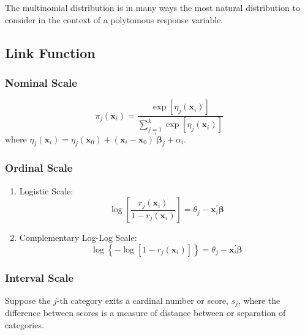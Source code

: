 The multinomial distribution is in many ways the most natural distribution to consider in the context of a polytomous response variable.

\subsection{Link Function}

\subsubsection*{Nominal Scale}

\begin{equation}
    \pi_{j}\left(\mathbf{x}_{i}\right)=\frac{\exp \left[\eta_{j}\left(\mathbf{x}_{i}\right)\right]}{\sum_{j=1}^{k} \exp \left[\eta_{j}\left(\mathbf{x}_{i}\right)\right]}
\end{equation}
where $\eta_{j}\left(\mathbf{x}_{i}\right)=\eta_{j}\left(\mathbf{x}_{0}\right)+\left(\mathbf{x}_{i}-\mathbf{x}_{0}\right)^{\prime}\boldsymbol{\beta}_{j}+\alpha_{i}$.

\subsubsection*{Ordinal Scale}

\begin{enumerate}
    \item Logistic Scale:
          \begin{equation}
              \log\left[\frac{r_{j}\left(\mathbf{x}_{i}\right)}{1-r_{j}\left(\mathbf{x}_{i}\right)}\right]=\theta_{j}-\mathbf{x}_{i}^{\prime}\boldsymbol{\beta}
          \end{equation}
    \item Complementary Log-Log Scale:
          \begin{equation}
              \log\left\{-\log\left[1-r_{j}\left(\mathbf{x}_{i}\right)\right]\right\}=\theta_{j}-\mathbf{x}_{i}^{\prime}\boldsymbol{\beta}
          \end{equation}
\end{enumerate}

\subsubsection*{Interval Scale}

Suppose the $j$-th category exits a cardinal number or score, $s_j$, where the difference between scores is a measure of distance between or separation of categories.

